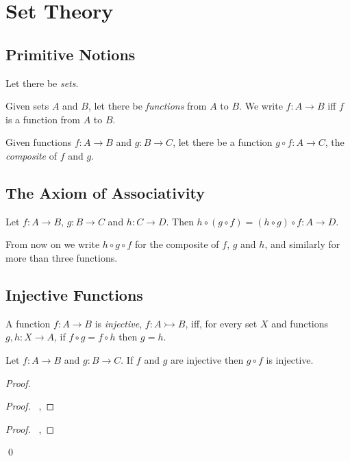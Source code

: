 \chapter{Set Theory}

\section{Primitive Notions}

Let there be \emph{sets}.

Given sets $A$ and $B$, let there be \emph{functions} from $A$ to $B$. We
write $f : A \rightarrow B$ iff $f$ is a function from $A$ to $B$.

Given functions $f : A \rightarrow B$ and $g : B \rightarrow C$, let there be
a function $g \circ f : A \rightarrow C$, the \emph{composite} of $f$ and $g$.

\section{The Axiom of Associativity}

\begin{ax}[Associativity]
  Let $f : A \rightarrow B$, $g : B \rightarrow C$ and $h : C \rightarrow D$.
  Then $h \circ (g \circ f) = (h \circ g) \circ f : A \rightarrow D$.
\end{ax}

From now on we write $h \circ g \circ f$ for the composite of $f$, $g$ and
$h$, and similarly for more than three functions.

\section{Injective Functions}

\begin{df}[Injective]
  A function $f : A \rightarrow B$ is \emph{injective}, $f : A
  \rightarrowtail B$, iff, for every set $X$ and functions $g, h : X
  \rightarrow
  A$, if $f \circ g = f \circ h$ then $g = h$.
\end{df}

\begin{prop}
\label{lm:sets:injective:comp}
 Let $f : A \rightarrow B$ and $g : B \rightarrow C$. If $f$ and $g$ are
injective then $g \circ f$ is injective.
\end{prop}

\begin{proof}
 \pf
 \begin{proof}
   \pf\ , 
 \end{proof}
 \begin{proof}
   \pf\ , 
 \end{proof}
 \qed
\end{proof}

